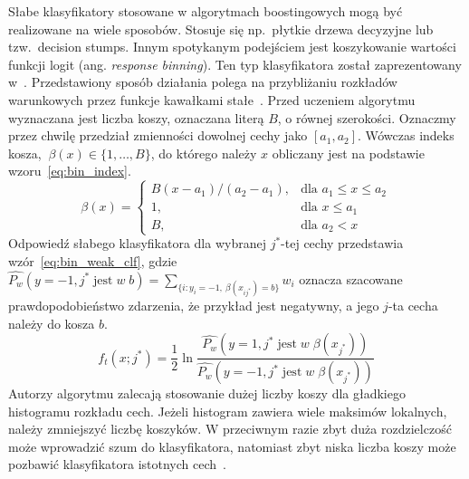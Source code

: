Słabe klasyfikatory stosowane w algorytmach boostingowych mogą być realizowane na wiele sposobów.
Stosuje się np.\ płytkie drzewa decyzyjne lub tzw.\ decision stumps.
Innym spotykanym podejściem jest koszykowanie wartości funkcji logit (ang. \textit{response binning}).
Ten typ klasyfikatora został zaprezentowany w~\cite{1689652}.
Przedstawiony sposób działania polega na przybliżaniu rozkładów warunkowych przez funkcje kawałkami stałe~\cite{szybka_detekcja_klesk}.
Przed uczeniem algorytmu wyznaczana jest liczba koszy, oznaczana literą $B$, o równej szerokości.
Oznaczmy przez chwilę przedział zmienności dowolnej cechy jako $[a_1,a_2]$.
Wówczas indeks kosza, $~\beta(x) \in \{1,\dots,B\}$, do którego należy $x$ obliczany jest na podstawie wzoru~\eqref{eq:bin_index}.
\begin{equation}
    \label{eq:bin_index}
    \beta(x)=\left.
    \begin{cases}
        B(x - a_1)/(a_2-a_1), & \text{dla } a_1 \leq x \leq a_2 \\
        1, & \text{dla } x \leq a_1 \\
        B, & \text{dla } a_2 < x
    \end{cases}
    \right.
\end{equation}
Odpowiedź słabego klasyfikatora dla wybranej $j^*$-tej cechy przedstawia wzór~\eqref{eq:bin_weak_clf}, gdzie\\ $\hat{P_w}(y=-1, j^*\;\text{jest}\;w\;b)=\sum_{\{i:y_i=-1,~\beta(x_{ij^*})=b\}}^{} w_i$ oznacza szacowane prawdopodobieństwo zdarzenia, że przykład jest negatywny, a jego $j$-ta cecha należy do kosza $b$.
\begin{equation}
    \label{eq:bin_weak_clf}
    f_t(x;j^*) = \dfrac{1}{2} \ln\dfrac{\hat{P_w}(y=1, j^*\;\text{jest}\;w\;\beta(x_{j^*}))}{\hat{P_w}(y=-1, j^*\;\text{jest}\;w\;\beta(x_{j^*}))}
\end{equation}
Autorzy algorytmu zalecają stosowanie dużej liczby koszy dla gładkiego histogramu rozkładu cech.
Jeżeli histogram zawiera wiele maksimów lokalnych, należy zmniejszyć liczbę koszyków.
W przeciwnym razie zbyt duża rozdzielczość może wprowadzić szum do klasyfikatora, natomiast zbyt niska liczba koszy może pozbawić klasyfikatora istotnych cech~\cite{1689652}.

